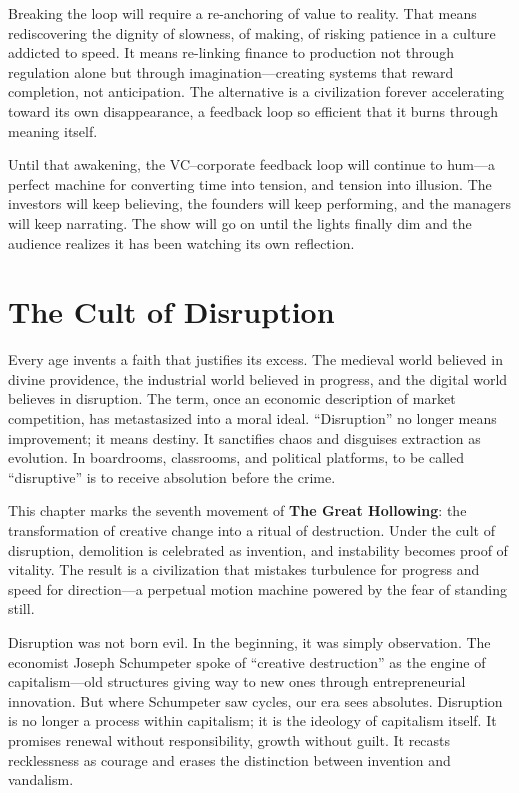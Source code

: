 \documentclass[11pt,twoside]{book}
\begin{document}
Breaking the loop will require a re-anchoring of value to reality.  That means rediscovering the dignity of slowness, of making, of risking patience in a culture addicted to speed.  It means re-linking finance to production not through regulation alone but through imagination—creating systems that reward completion, not anticipation.  The alternative is a civilization forever accelerating toward its own disappearance, a feedback loop so efficient that it burns through meaning itself.

Until that awakening, the VC–corporate feedback loop will continue to hum—a perfect machine for converting time into tension, and tension into illusion.  The investors will keep believing, the founders will keep performing, and the managers will keep narrating.  The show will go on until the lights finally dim and the audience realizes it has been watching its own reflection.

%
\chapter{The Cult of Disruption}
\label{ch:07}

Every age invents a faith that justifies its excess.  
The medieval world believed in divine providence, the industrial world believed in progress, and the digital world believes in disruption.  The term, once an economic description of market competition, has metastasized into a moral ideal.  “Disruption” no longer means improvement; it means destiny.  It sanctifies chaos and disguises extraction as evolution.  In boardrooms, classrooms, and political platforms, to be called “disruptive” is to receive absolution before the crime.  

This chapter marks the seventh movement of \textbf{The Great Hollowing}: the transformation of creative change into a ritual of destruction.  Under the cult of disruption, demolition is celebrated as invention, and instability becomes proof of vitality.  The result is a civilization that mistakes turbulence for progress and speed for direction—a perpetual motion machine powered by the fear of standing still.

Disruption was not born evil.  In the beginning, it was simply observation.  The economist Joseph Schumpeter spoke of “creative destruction” as the engine of capitalism—old structures giving way to new ones through entrepreneurial innovation.  But where Schumpeter saw cycles, our era sees absolutes.  Disruption is no longer a process within capitalism; it is the ideology of capitalism itself.  It promises renewal without responsibility, growth without guilt.  It recasts recklessness as courage and erases the distinction between invention and vandalism.
\end{document}
